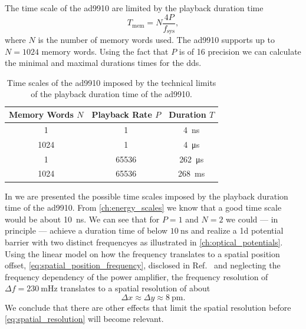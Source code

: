 The time scale of the \gls{ad9910} are limited by the playback duration time
\begin{equation}
  T_\text{mem}
  =N\frac{4P}{f_\text{sys}}
  \label{eq:dds_playback_duration},
\end{equation}
where $N$ is the number of memory words used. The \gls{ad9910} supports up to
$N=1024$ memory words. Using the fact that $P$ is of \SI{16}{\bit} precision
we can calculate the minimal and maximal durations times for the \gls{dds}.
\begin{table}[htb]
  \centering
  \begin{tabular}{ccc}
    \toprule
    Memory Words $N$ & Playback Rate $P$ & Duration $T$ \\
    \midrule
    \num{1} & \num{1} & \SI{4}{\nano\second} \\
    \num{1024} & \num{1} & \SI{4}{\micro\second} \\
    \num{1} & \num{65536} & \SI{262}{\micro\second} \\
    \num{1024} & \num{65536} & \SI{268}{\milli\second} \\
    \bottomrule
  \end{tabular}
  \caption{Time scales of the \gls{ad9910} imposed by the technical limits of
    the playback duration time of the \gls{ad9910}.
  }\label{tab:dds_time_scale}
\end{table}
In  we are presented the possible time scales
imposed by the playback duration time of the \gls{ad9910}. From
\cref{ch:energy_scales} we know that a good time scale would be about
\SI{10}{\nano\second}. We can see that for $P=1$ and $N=2$ we could --- in
principle --- achieve a duration time of below $\SI{10}{\nano\second}$ and
realize a \gls{1d} potential barrier with two distinct frequencyes as
illustrated in \cref{ch:optical_potentials}. Using the linear model on how
the frequency translates to a spatial position offset,
\cref{eq:spatial_position_frequency}, disclosed in Ref.~\cite{Hertlein2017}
and neglecting the frequency dependency of the power amplifier, the frequency
resolution of $\Delta f=\SI{230}{\milli\hertz}$ translates to a spatial
resolution of about
\begin{equation}
  \Delta x\approx \Delta y\approx\SI{8}{\pico\meter}
  \label{eq:spatial_resolution}.
\end{equation}
We conclude that there are other effects that limit the spatial resolution
before \cref{eq:spatial_resolution} will become relevant.
